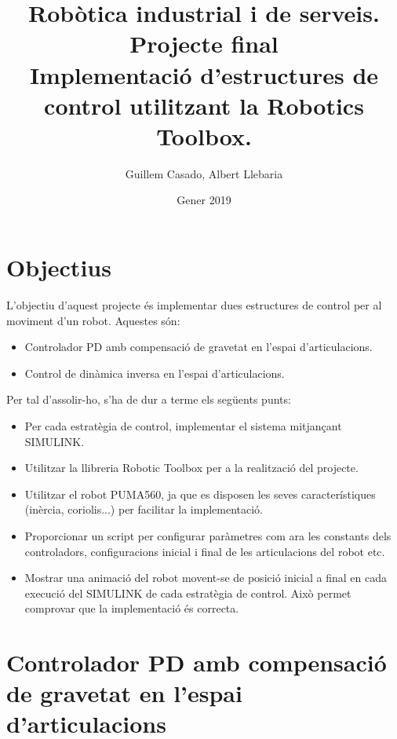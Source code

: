 \documentclass[]{article}
\title{Robòtica industrial i de serveis. \\ Projecte final \\ Implementació d'estructures de control utilitzant la Robotics Toolbox. }
\author{Guillem Casado, Albert Llebaria}
\date{Gener 2019}
\begin{document}
\maketitle
\begin{abstract}
\end{abstract}
\section{Objectius}
L'objectiu d'aquest projecte és implementar dues estructures de control per al moviment d'un robot. Aquestes són: 
\begin{itemize}
\item Controlador PD amb compensació de gravetat en l'espai d'articulacions. 
\item Control de dinàmica inversa en l'espai d'articulacions.
\end{itemize}
Per tal d'assolir-ho, s'ha de dur a terme els següents punts:
\begin{itemize}
\item Per cada estratègia de control, implementar el sistema mitjançant SIMULINK. 
\item Utilitzar la llibreria Robotic Toolbox per a la realització del projecte. 
\item Utilitzar el robot PUMA560, ja que es disposen les seves característiques (inèrcia, coriolis...) per facilitar la implementació. 
\item Proporcionar un script per configurar paràmetres com ara les constants dels controladors, configuracions inicial i final de les articulacions del robot etc.
\item Mostrar una animació del robot movent-se de posició inicial a final en cada execució del SIMULINK de cada estratègia de control. Això permet comprovar que la implementació és correcta. 
\end{itemize}
\section{Controlador PD amb compensació de gravetat en l'espai d'articulacions}
\end{document}
